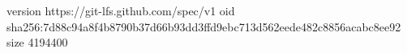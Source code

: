version https://git-lfs.github.com/spec/v1
oid sha256:7d88c94a8f4b8790b37d66b93dd3ffd9ebc713d562eede482c8856acabc8ee92
size 4194400
